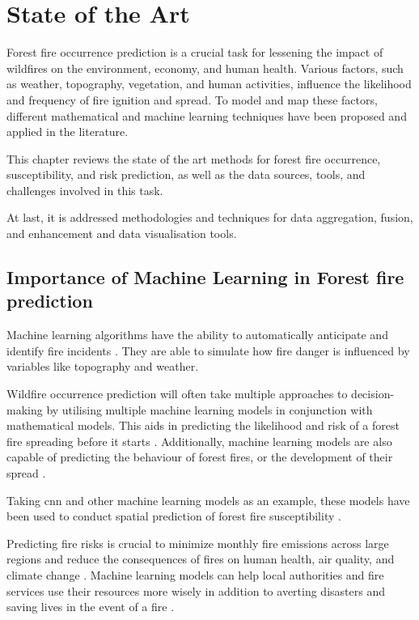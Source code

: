 

\chapter{State of the Art}
\label{sec:sota}

Forest fire occurrence prediction is a crucial task for lessening the impact of wildfires on the environment, economy, and human health. Various factors, such as weather, topography, vegetation, and human activities, influence the likelihood and frequency of fire ignition and spread. To model and map these factors, different mathematical and machine learning techniques have been proposed and applied in the literature. 


This chapter reviews the state of the art methods for forest fire occurrence, susceptibility, and risk prediction, as well as the data sources, tools, and challenges involved in this task.


At last, it is addressed methodologies and techniques for data aggregation, fusion, and enhancement and data visualisation tools.


\section{Importance of Machine Learning in Forest fire prediction}
Machine learning algorithms have the ability to automatically anticipate and identify fire incidents \cite{Abid2021}. They are able to simulate how fire danger is influenced by variables like topography and weather. 


Wildfire occurrence prediction will often take multiple approaches to decision-making by utilising multiple machine learning models in conjunction with mathematical models. This aids in predicting the likelihood and risk of a forest fire spreading before it starts \cite{Abid2021}. Additionally, machine learning models are also capable of predicting the behaviour of forest fires, or the development of their spread \cite{Abid2021}.


Taking \gls{cnn} and other machine learning models as an example, these models have been used to conduct spatial prediction of forest fire susceptibility \cite{zhang2019forest}. 


Predicting fire risks is crucial to minimize monthly fire emissions across large regions and reduce the consequences of fires on human health, air quality, and climate change \cite{wang2022interpreting}. Machine learning models can help local authorities and fire services use their resources more wisely in addition to averting disasters and saving lives in the event of a fire \cite{surya2017risk}.


